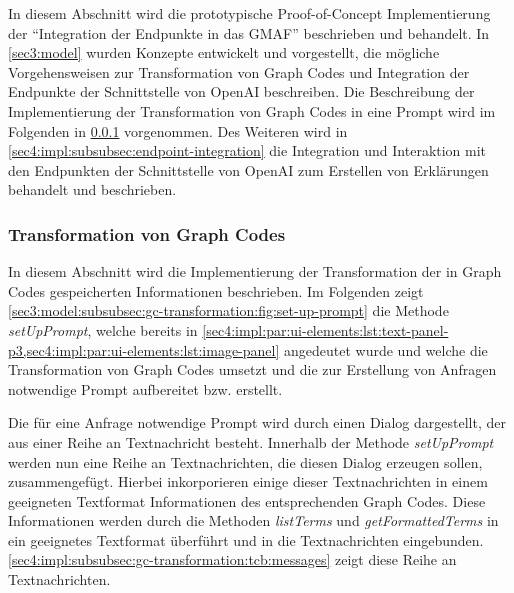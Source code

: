 In diesem Abschnitt wird die prototypische Proof-of-Concept Implementierung der \enquote{Integration der Endpunkte in das GMAF} beschrieben und behandelt.
In \cref{sec3:model} wurden Konzepte entwickelt und vorgestellt, die mögliche Vorgehensweisen zur Transformation von Graph Codes und Integration der Endpunkte der Schnittstelle von OpenAI beschreiben.
Die Beschreibung der Implementierung der Transformation von Graph Codes in eine Prompt wird im Folgenden in \cref{sec4:impl:subsubsec:gc-transformation} vorgenommen.
Des Weiteren wird in \cref{sec4:impl:subsubsec:endpoint-integration} die Integration und Interaktion mit den Endpunkten der Schnittstelle von OpenAI zum Erstellen von Erklärungen behandelt und beschrieben.

\subsubsection{Transformation von Graph Codes}
\label{sec4:impl:subsubsec:gc-transformation}
In diesem Abschnitt wird die Implementierung der Transformation der in Graph Codes gespeicherten Informationen beschrieben.
Im Folgenden zeigt \cref{sec3:model:subsubsec:gc-transformation:fig:set-up-prompt} die Methode \textit{setUpPrompt}, welche bereits in \cref{sec4:impl:par:ui-elements:lst:text-panel-p3,sec4:impl:par:ui-elements:lst:image-panel} angedeutet wurde und welche die Transformation von Graph Codes umsetzt und die zur Erstellung von Anfragen notwendige Prompt aufbereitet bzw. erstellt.



Die für eine Anfrage notwendige Prompt wird durch einen Dialog dargestellt, der aus einer Reihe an Textnachricht besteht.
Innerhalb der Methode \textit{setUpPrompt} werden nun eine Reihe an Textnachrichten, die diesen Dialog erzeugen sollen, zusammengefügt.
Hierbei inkorporieren einige dieser Textnachrichten in einem geeigneten Textformat Informationen des entsprechenden Graph Codes.
Diese Informationen werden durch die Methoden \textit{listTerms} und \textit{getFormattedTerms} in ein geeignetes Textformat überführt und in die Textnachrichten eingebunden.
\cref{sec4:impl:subsubsec:gc-transformation:tcb:messages} zeigt diese Reihe an Textnachrichten.

